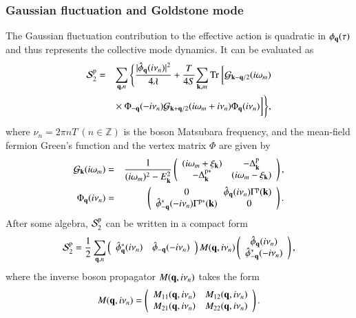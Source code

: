 \documentclass[aps,prd,amsmath,two column,nofootinbib,amssymb,referee]{revtex4}
\begin{document}
\subsubsection{Gaussian fluctuation and Goldstone mode}\label{sectionp2}
The Gaussian fluctuation contribution to the effective action is quadratic in $\phi_{\bf q}(\tau)$ and thus represents the collective mode dynamics. It can be evaluated as
\begin{eqnarray}
{\cal S}_2^{\rm p}&=&\sum_{{\bf q},n}\Bigg\{{|\hat\phi_{\bf q}(i\nu_n)|^2\over4\lambda}+{T\over4S}\!\sum_{{\bf k},m}{\rm Tr}~\bigg[{\cal G}_{{\bf k}-{\bf q}/2}(i\omega_m) \nonumber\\
&&\times~\Phi_{\bf -q}(-i\nu_n){\cal G}_{{\bf k}+{\bf q}/2}(i\omega_m+i\nu_n)\Phi_{\bf q}(i\nu_n)\bigg]\Bigg\},
\end{eqnarray}
where $\nu_n=2\pi nT ~(n\in\mathbb{Z})$ is the boson Matsubara frequency, and the mean-field fermion Green's function and the vertex matrix $\Phi$ are given by
\begin{eqnarray}
{\cal G}_{\bf k}(i\omega_m)&=&{1\over(i\omega_m)^2-E_{{\bf k}}^2}\left(\begin{array}{cc}
(i\omega_m+\xi_{{\bf k}})&-\Delta_{\bf k}^{\rm p}\\
-\Delta_{\bf k}^{{\rm p}*}&(i\omega_m-\xi_{{\bf k}})
\end{array}\right),\nonumber\\
\Phi_{\bf q}(i\nu_n)&=&\left(\begin{array}{cc}
0&\!\!\hat\phi_{\bf q}(i\nu_n)\Gamma^{\rm p}({\bf k})\\
\hat\phi_{\bf -q}^*(-i\nu_n)\Gamma^{\rm p*}({\bf k})&0
\end{array}\right).
\end{eqnarray}
After some algebra, ${\cal S}_2^{\rm p}$ can be written in a compact form 
\begin{eqnarray}
{\cal S}_2^{\rm p}=\frac{1}{2}\sum_{{\bf q},n}\left(\begin{array}{cc}
\hat{\phi}_{\bf q}^*(i\nu_n) & \hat{\phi}_{-{\bf q}}(-i\nu_n)\end{array}\right) M({\bf q},i\nu_n)\left(\begin{array}{cc} \hat{\phi}_{\bf q}(i\nu_n)\\
\hat{\phi}_{-{\bf q}}^*(-i\nu_n)\end{array}\right),
\end{eqnarray}
where the inverse boson propagator $M({\bf q},i\nu_n)$ takes the form
\begin{eqnarray}
M({\bf q},i\nu_n)=\left(\begin{array}{cc}M_{11}({\bf q},i\nu_n)&M_{12}({\bf q},i\nu_n)\\
M_{21}({\bf q},i\nu_n)& M_{22}({\bf q},i\nu_n)\end{array}\right).
\end{eqnarray}
\end{document}
